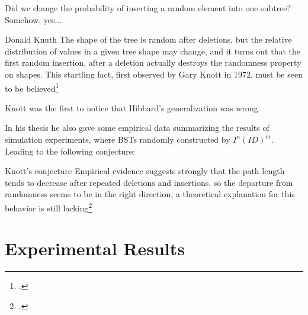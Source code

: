 \documentclass{beamer}
\begin{document}
\begin{frame}
\begin{center}
{            Did we change the probability of inserting a random element into one subtree? Somehow, yes...
        }
    \end{center}
\end{frame}

\begin{frame}
    \begin{block}{Donald Knuth}
        The shape of the tree is random after deletions, but the relative distribution of values in a given tree shape may change, and it turns out that the first random insertion, after a deletion actually destroys the randomness property on shapes. This startling fact, first observed by Gary Knott in 1972, must be seen to be believed\footcite{knuth1998art}
    \end{block}
\end{frame}

\begin{frame}
    Knott was the first to notice that Hibbard's generalization was wrong. 
    \pause

    In his thesis he also gave some empirical data summarizing the results of simulation experiments, where BSTs randomly constructed by $I^n(ID)^m$. Leading to the following conjecture:
    \begin{block}{Knott's conjecture}
        Empirical evidence suggests strongly that the path length tends to decrease after repeated deletions and insertions, so the
        departure from randomness seems to be in the right direction; a theoretical explanation for this behavior is still lacking\footcite{knuth1998art}
    \end{block}
\end{frame}

\section{Experimental Results}
\end{document}
